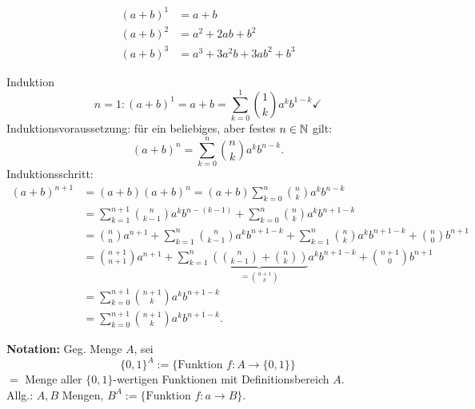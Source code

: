 \documentclass[../ana1.tex]{subfiles}
\begin{document}
\begin{bem}
	\begin{align}
		{(a+b)}^1 & = a+b                     \\
		{(a+b)}^2 & = a^2 + 2ab + b^2         \\
		{(a+b)}^3 & = a^3 +3a^2b + 3ab^2 +b^3
	\end{align}
\end{bem}
\begin{bew} Induktion
	\[ n=1: {(a+b)}^1 = a+b = \sum_{k=0}^{1}\binom{1}{k} a^k b^{1-k} \checkmark{} \]
	Induktionsvoraussetzung: für ein beliebiges, aber festes \(n \in\mathbb{N} \) gilt:
	\[ {(a+b)}^n = \sum_{k=0}^{n} \binom{n}{k} a^k b^{n-k}. \]
	Induktionsschritt:
	\begin{align*}
		{(a+b)}^{n+1} & = (a+b) {(a+b)}^n = (a+b) \sum_{k=0}^{n} \binom{n}{k} a^k b^{n-k}                                                                                            \\
		              & = \sum_{k=1}^{n+1} \binom{n}{k-1} a^k b^{n-(k-1)} + \sum_{k=0}^{n} \binom{n}{k} a^k b^{n+1-k}                                                                \\
		              & = \binom{n}{n} a^{n+1} + \sum_{k=1}^{n} \binom{n}{k-1} a^k b^{n+1-k} + \sum_{k=1}^{n} \binom{n}{k} a^k b^{n+1-k} + \binom{n}{0} b^{n+1}                      \\
		              & = \binom{n+1}{n+1} a^{n+1} + \sum_{k=1}^{n} \underbrace{\left(\binom{n}{k-1} + \binom{n}{k}\right)}_{=\binom{n+1}{k}} a^k b^{n+1-k} + \binom{n+1}{0} b^{n+1} \\
		              & = \sum_{k=0}^{n+1} \binom{n+1}{k} a^k b^{n+1-k}                                                                                                              \\
		              & = \sum_{k=0}^{n+1} \binom{n+1}{k} a^k b^{n+1-k}.
	\end{align*}
\end{bew}

\textbf{Notation:} Geg. Menge \(A\), sei \[ \{0,1\}^A := \{ \text{Funktion }f:A\rightarrow \{0,1\} \} \] \(= \) Menge aller \(\{0,1\}\)-wertigen Funktionen mit Definitionsbereich \(A\).\\
Allg.: \(A,B\) Mengen, \(B^A := \{ \text{Funktion } f: a\rightarrow B\}\).
\end{document}

